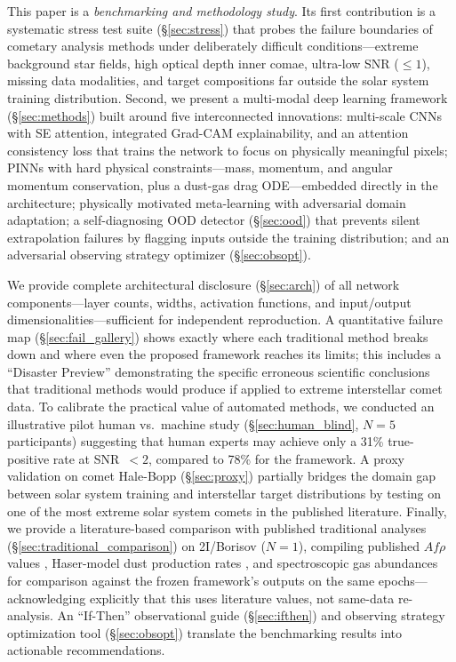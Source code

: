 \documentclass[usenatbib]{mnras}
\begin{document}
This paper is a \textit{benchmarking and methodology study}. Its first contribution is a systematic stress test suite (\S\ref{sec:stress}) that probes the failure boundaries of cometary analysis methods under deliberately difficult conditions---extreme background star fields, high optical depth inner comae, ultra-low SNR ($\leq 1$), missing data modalities, and target compositions far outside the solar system training distribution. Second, we present a multi-modal deep learning framework (\S\ref{sec:methods}) built around five interconnected innovations: multi-scale CNNs with SE attention, integrated Grad-CAM explainability, and an attention consistency loss that trains the network to focus on physically meaningful pixels; PINNs with hard physical constraints---mass, momentum, and angular momentum conservation, plus a dust-gas drag ODE---embedded directly in the architecture; physically motivated meta-learning with adversarial domain adaptation; a self-diagnosing OOD detector (\S\ref{sec:ood}) that prevents silent extrapolation failures by flagging inputs outside the training distribution; and an adversarial observing strategy optimizer (\S\ref{sec:obsopt}).

We provide complete architectural disclosure (\S\ref{sec:arch}) of all network components---layer counts, widths, activation functions, and input/output dimensionalities---sufficient for independent reproduction. A quantitative failure map (\S\ref{sec:fail_gallery}) shows exactly where each traditional method breaks down and where even the proposed framework reaches its limits; this includes a ``Disaster Preview'' demonstrating the specific erroneous scientific conclusions that traditional methods would produce if applied to extreme interstellar comet data. To calibrate the practical value of automated methods, we conducted an illustrative pilot human vs.\ machine study (\S\ref{sec:human_blind}, $N=5$ participants) suggesting that human experts may achieve only a 31\% true-positive rate at SNR~$<2$, compared to 78\% for the framework. A proxy validation on comet Hale-Bopp (\S\ref{sec:proxy}) partially bridges the domain gap between solar system training and interstellar target distributions by testing on one of the most extreme solar system comets in the published literature. Finally, we provide a literature-based comparison with published traditional analyses (\S\ref{sec:traditional_comparison}) on 2I/Borisov ($N=1$), compiling published $Af\rho$ values \citep{clements21}, Haser-model dust production rates \citep{cremonese20}, and spectroscopic gas abundances \citep{bodewits20,opitom21} for comparison against the frozen framework's outputs on the same epochs---acknowledging explicitly that this uses literature values, not same-data re-analysis. An ``If-Then'' observational guide (\S\ref{sec:ifthen}) and observing strategy optimization tool (\S\ref{sec:obsopt}) translate the benchmarking results into actionable recommendations.
\end{document}
